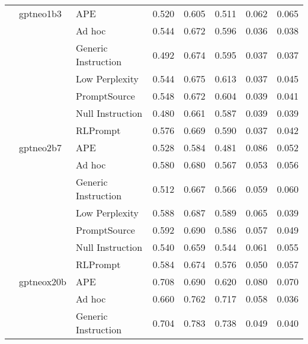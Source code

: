 \begin{supertabular}{lllrrrrr}
              & gptneo1b3 & APE &            0.520 &           0.605 &          0.511 &        0.062 &    0.065 \\
              &        & Ad hoc &            0.544 &           0.672 &          0.596 &        0.036 &    0.038 \\
              &        & Generic Instruction &            0.492 &           0.674 &          0.595 &        0.037 &    0.037 \\
              &        & Low Perplexity &            0.544 &           0.675 &          0.613 &        0.037 &    0.045 \\
              &        & PromptSource &            0.548 &           0.672 &          0.604 &        0.039 &    0.041 \\
              &        & Null Instruction &            0.480 &           0.661 &          0.587 &        0.039 &    0.039 \\
              &        & RLPrompt &            0.576 &           0.669 &          0.590 &        0.037 &    0.042 \\
              & gptneo2b7 & APE &            0.528 &           0.584 &          0.481 &        0.086 &    0.052 \\
              &        & Ad hoc &            0.580 &           0.680 &          0.567 &        0.053 &    0.056 \\
              &        & Generic Instruction &            0.512 &           0.667 &          0.566 &        0.059 &    0.060 \\
              &        & Low Perplexity &            0.588 &           0.687 &          0.589 &        0.065 &    0.039 \\
              &        & PromptSource &            0.592 &           0.690 &          0.586 &        0.057 &    0.049 \\
              &        & Null Instruction &            0.540 &           0.659 &          0.544 &        0.061 &    0.055 \\
              &        & RLPrompt &            0.584 &           0.674 &          0.576 &        0.050 &    0.057 \\
              & gptneox20b & APE &            0.708 &           0.690 &          0.620 &        0.080 &    0.070 \\
              &        & Ad hoc &            0.660 &           0.762 &          0.717 &        0.058 &    0.036 \\
              &        & Generic Instruction &            0.704 &           0.783 &          0.738 &        0.049 &    0.040 \\

\end{supertabular}
